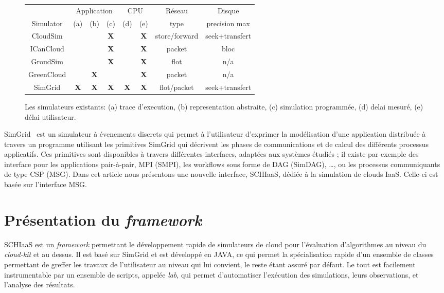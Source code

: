 \documentclass[parallelisme]{compas2017}
\begin{document}
\begin{figure}[hbt]
\begin{tabular}{|c||c|c|c||c|c|c|c|}
	\hline
	& \multicolumn{3}{c|}{Application} &
	\multicolumn{2}{c|}{CPU}&Réseau&Disque\\
	\cline{2-8}
	Simulator &(a) 
                  &(b)
                  &(c)
                  &(d)
                  &(e)&
	type & precision max\\
	\hline
	CloudSim & & & \bf X &&\bf
	X&store/forward&seek+transfert\\ \hline
	ICanCloud & & & \bf X &&\bf X&packet& bloc \\ \hline
	GroudSim & & & \bf X &&\bf X&flot& n/a\\\hline
	GreenCloud & & \bf X &&&\bf X&packet& n/a\\ \hline
	SimGrid & \bf X & \bf X & \bf X &\bf X&\bf X& flot/packet &
	seek+transfert \\
	\hline
\end{tabular}
\caption{Les simulateurs existants: (a) trace d'execution, (b) representation abstraite, (c) simulation
  programmée, (d) delai mesuré, (e) délai utilisateur.}
\label{fig:sim-features}
\end{figure}

SimGrid~\cite{simgrid}  est un  simulateur à  évenements discrets  qui permet  à
l'utilisateur d'exprimer la modélisation  d'une application distribuée à travers
un  programme utilisant  les  primitives  SimGrid qui  décrivent  les phases  de
communications et de calcul des différents processus applicatifs. Ces primitives
sont disponibles à travers différentes interfaces, adaptées aux systèmes étudiés
; il  existe par exemple  des interface  pour les applications  pair-à-pair, MPI
(SMPI),  les workflows  sous forme  de DAG  (SimDAG), \ldots,  ou les  processus
communiquants de type  CSP (MSG). Dans cet article nous  présentons une nouvelle
interface, SCHIaaS,  dédiée à la simulation  de clouds IaaS. Celle-ci  est basée
sur l'interface MSG.



\section{Présentation du \textit{framework}}

SCHIaaS est un \textit{framework} permettant le développement rapide de simulateurs 
de cloud pour l'évaluation d'algorithmes au niveau du \textit{cloud-kit} et au dessus.
Il est basé sur SimGrid et est développé en JAVA, ce qui permet la spécialisation 
rapide d'un ensemble de classes permettant de greffer les travaux de l'utilisateur au 
niveau qui lui convient, le reste étant assuré par défaut.
Le tout est facilement instrumentable par un ensemble de scripts, appelée \emph{lab},
qui permet d'automatiser l'exécution des simulations, leurs observations, et l'analyse
des résultats.
\end{document}
